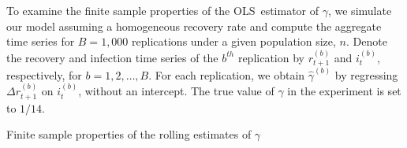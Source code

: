 \documentclass[12pt]{article}
\begin{document}
To examine the finite sample properties of the OLS\ estimator of $\gamma$, we
simulate our model assuming a homogeneous recovery rate and compute the
aggregate time series for $B=1,000$ replications under a given population
size, $n$. Denote the recovery and infection time series of the $b^{th}$
replication by $r_{t+1}^{(b)}$ and $i_{t}^{(b)}$, respectively, for
$b=1,2,\ldots,B.$ For each replication, we obtain $\hat{\gamma}^{(b)}$ by
regressing $\Delta r_{t+1}^{(b)}$ on $i_{t}^{(b)}$, without an intercept. The
true value of $\gamma$ in the experiment is set to $1/14$.%

\begin{table}[tb]%
\caption{Finite sample properties of the rolling estimates of $\gamma$}%
\label{tab: gamma}%
\renewcommand{\arraystretch}{1.1}%
\vspace{-0.35cm}%



\end{table}
\end{document}

